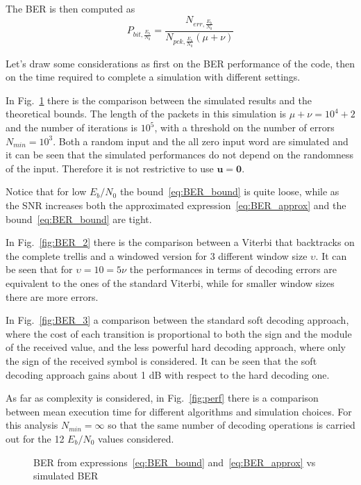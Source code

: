 \documentclass[10pt]{article}
\newlength\fheight
\newlength\fwidth
\begin{document}
The BER is then computed as
\begin{equation}
	P_{bit, \frac{E_b}{N_0}} =\frac{N_{err, \frac{E_b}{N_0}}}{N_{pck, \frac{E_b}{N_0}}(\mu+\nu)}
\end{equation}

Let's draw some considerations as first on the BER performance of the code, then on the time required to complete a simulation with different settings.

In Fig.~\ref{fig:BER_1} there is the comparison between the simulated results and the theoretical bounds. The length of the packets in this simulation is $\mu + \nu = 10^4 + 2$ and the number of iterations is $10^5$, with a threshold on the number of errors $N_{min} = 10^3$. Both a random input and the all zero input word are simulated and it can be seen that the simulated performances do not depend on the randomness of the input. Therefore it is not restrictive to use $\mathbf{u} = \mathbf{0}$.

Notice that for low $E_b/N_0$ the bound~\eqref{eq:BER_bound} is quite loose, while as the SNR increases both the approximated expression~\eqref{eq:BER_approx} and the bound~\eqref{eq:BER_bound} are tight. 

In Fig.~\ref{fig:BER_2} there is the comparison between a Viterbi that backtracks on the complete trellis and a windowed version for 3 different window size $\upsilon$. It can be seen that for $\upsilon = 10 = 5\nu$ the performances in terms of decoding errors are equivalent to the ones of the standard Viterbi, while for smaller window sizes there are more errors. 

In Fig.~\ref{fig:BER_3} a comparison between the standard soft decoding approach, where the cost of each transition is proportional to both the sign and the module of the received value, and the less powerful hard decoding approach, where only the sign of the received symbol is considered. It can be seen that the soft decoding approach gains about 1 dB with respect to the hard decoding one. 

As far as complexity is considered, in Fig.~\ref{fig:perf} there is a comparison between mean execution time for different algorithms and simulation choices. 
For this analysis $N_{min} = \infty$ so that the same number of decoding operations is carried out for the 12 $E_b/N_0$ values considered. 


\begin{figure}[t]
\centering
\setlength{}
\setlength{}

\caption{BER from expressions~\eqref{eq:BER_bound} and~\eqref{eq:BER_approx} vs simulated BER}
\label{fig:BER_1}
\end{figure}
\end{document}
